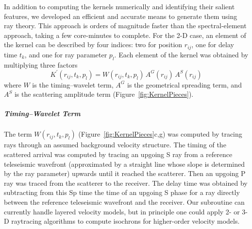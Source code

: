 \documentclass[referee]{gji}
\begin{document}
In addition to computing the kernels numerically and identifying their salient features, we developed an efficient and accurate means to generate them using ray theory. This approach is orders of magnitude faster than the spectral-element approach, taking a few core-minutes to complete.  For the 2-D case, an element of the kernel can be described by four indices: two for position $r_{ij}$, one for delay time $t_k$, and one for ray parameter $p_l$.  Each element of the kernel was obtained by multiplying three factors
\begin{equation}
\label{eqn:KernelRayTheory}
K^\prime (r_{ij},t_k,p_l) = W(r_{ij},t_k,p_l) \, A^G(r_{ij}) \, A^S(r_{ij})
\end{equation}
where $W$ is the timing--wavelet term, $A^G$ is the geometrical spreading term, and $A^S$ is the scattering amplitude term (Figure~\ref{fig:KernelPieces}).

\subparagraph{Timing--Wavelet Term}
The term $W(r_{ij},t_k,p_l)$ (Figure~\ref{fig:KernelPieces}c,g) was computed by tracing rays through an assumed background velocity structure. The timing of the scattered arrival was computed by tracing an upgoing S ray from a reference teleseismic wavefront (approximated by a straight line whose slope is determined by the ray parameter) upwards until it reached the scatterer.  Then an upgoing P ray was traced from the scatterer to the receiver.  The delay time was obtained by subtracting from this Sp time the time of an upgoing S phase for a ray directly between the reference teleseismic wavefront and the receiver.  Our subroutine can currently handle layered velocity models, but in principle one could apply 2- or 3-D raytracing algorithms to compute isochrons for higher-order velocity models.
\end{document}

